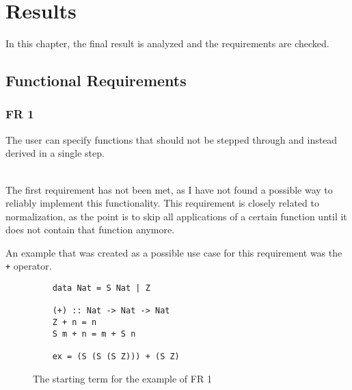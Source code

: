 \chapter{Results}
    \label{chptr:Results}

In this chapter,
the final result is analyzed and the requirements are checked.


\section{Functional Requirements}

\subsection{FR 1}
The user can specify functions that should not be stepped through and instead derived in a single step.

\ \\
The first requirement has not been met,
as I have not found a possible way to reliably implement this functionality.
This requirement is closely related to normalization,
as the point is to skip all applications of a certain function until it does not contain that function anymore.

An example that was created as a possible use case for this requirement was the \texttt{+} operator.

\begin{figure}[!ht]
\begin{verbatim}
    data Nat = S Nat | Z

    (+) :: Nat -> Nat -> Nat
    Z + n = n
    S m + n = m + S n

    ex = (S (S (S Z))) + (S Z)
\end{verbatim}
    \caption{The starting term for the example of FR 1}
    \label{fig:FR1example}
\end{figure}

